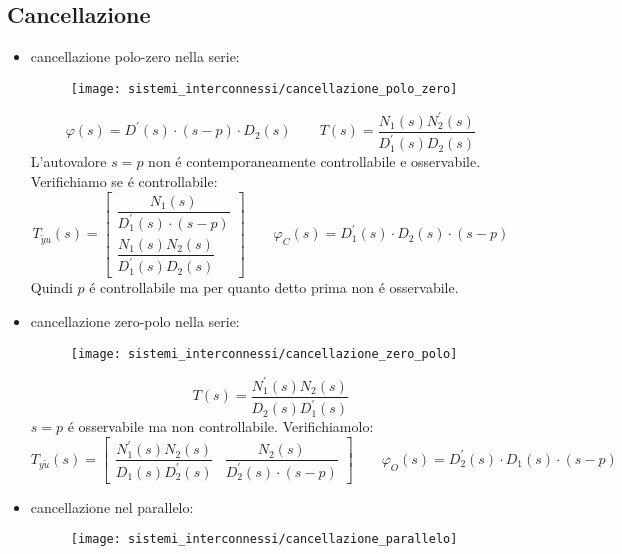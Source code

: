 \documentclass[../main.tex]{subfiles}
\begin{document}
	\subsection{Cancellazione}
		\begin{itemize}
			\item 
				cancellazione polo-zero nella serie:
				\begin{figure}[H]
					\centering\texttt{[image: sistemi\_interconnessi/cancellazione\_polo\_zero]}
				\end{figure}
			
				\[
					\varphi(s) = D^{'}(s) \cdot (s-p) \cdot D_2(s) \qquad T(s) = \dfrac{N_1(s) N_2^{'}(s)}{D_1^{'}(s) D_2(s)}
				\]
				L'autovalore $ s=p $ non \'e contemporaneamente controllabile e osservabile. Verifichiamo se \'e controllabile:
				\[
					T_{\tilde y u}(s) =
					\begin{bmatrix}
						\dfrac{N_1(s)}{D_1^{'}(s) \cdot (s-p)}\\[.5cm]
						\dfrac{N_1(s)N_2(s)}{D_1^{'}(s) D_2(s)}
					\end{bmatrix}
					\qquad
					\varphi_C(s) = D_1^{'}(s) \cdot D_2(s) \cdot (s-p)
				\]
				Quindi $ p $ \'e controllabile ma per quanto detto prima non \'e osservabile.
			\item 
				cancellazione zero-polo nella serie:
				\begin{figure}[H]
					\centering\texttt{[image: sistemi\_interconnessi/cancellazione\_zero\_polo]}
				\end{figure}
			
				\[
					T(s) =
					\dfrac{N_1^{'}(s) N_2(s)}{D_2(s) D_1^{'}(s)}
				\]
				$ s=p $ \'e osservabile ma non controllabile. Verifichiamolo:
				\[
					T_{y \tilde u}(s) =
					\begin{bmatrix}
						\dfrac{N_1^{'}(s) N_2(s)}{D_1(s) D_2^{'}(s)} & \dfrac{N_2(s)}{D_2^{'}(s) \cdot (s-p)}
					\end{bmatrix}
					\qquad
					\varphi_O(s) = D_2^{'}(s) \cdot D_1(s) \cdot (s-p)
				\]
			\item 
				cancellazione nel parallelo:
				\begin{figure}[H]
					\centering\texttt{[image: sistemi\_interconnessi/cancellazione\_parallelo]}
				\end{figure}
			

\end{itemize}
\end{document}
